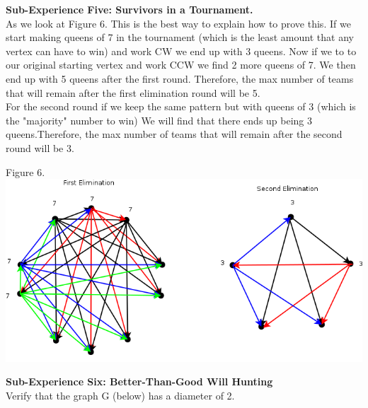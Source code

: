 \documentclass[10pt,a4paper]{report}
\begin{document}
	\begin{center}
		
	\end{center}
	\textbf{Sub-Experience Five: Survivors in a Tournament.}\\
	As we look at Figure 6. This is the best way to explain how to prove this.  If we start making queens of 7 in the tournament (which is the least amount that any vertex can have to win) and work CW we end up with 3 queens. Now if we to to our original starting vertex and work CCW we find 2 more queens of 7.  We then end up with 5 queens after the first round.  Therefore, the max number of teams that will remain after the first elimination round will be 5.\\
	\newline
	For the second round if we keep the same pattern but with queens of 3 (which is the "majority" number to win) We will find that there ends up being 3 queens.Therefore, the max number of teams that will remain after the second round will be 3.\\
	\begin{center}
		Figure 6.\\
		\includegraphics[scale=.5]{e5.png}
		\newline
		\newline
	\end{center}
	\pagebreak
	\textbf{Sub-Experience Six: Better-Than-Good Will Hunting}\\
	Verify that the graph G (below) has a diameter of 2.\\
	
\end{document}
